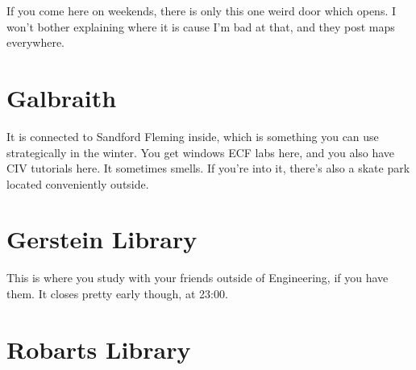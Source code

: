 If you come here on weekends, there is only this one weird door which opens. I won't bother explaining where it is cause I'm bad at that, and they post maps everywhere.

\section{Galbraith}

It is connected to Sandford Fleming inside, which is something you can use strategically in the winter. You get windows ECF labs here, and you also have CIV tutorials here. It sometimes smells. If you're into it, there's also a skate park located conveniently outside.

\section{Gerstein Library}

This is where you study with your friends outside of Engineering, if you have them. It closes pretty early though, at 23:00.

\section{Robarts Library}

